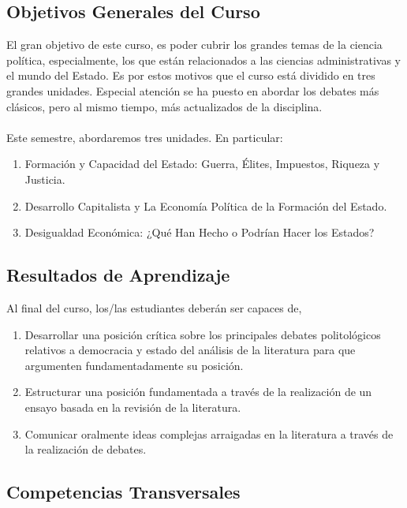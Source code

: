 \documentclass[letterpaper]{article}
\begin{document}
\subsection*{Objetivos Generales del Curso}

El gran objetivo de este curso, es poder cubrir los grandes temas de la ciencia pol\'itica, especialmente, los que est\'an relacionados a las ciencias administrativas y el mundo del Estado. Es por estos motivos que el curso est\'a dividido en tres grandes unidades. Especial atenci\'on se ha puesto en abordar los debates m\'as cl\'asicos, pero al mismo tiempo, m\'as actualizados de la disciplina.
\\
\\
Este semestre, abordaremos tres unidades. En particular:

\begin{enumerate}
	\item Formaci\'on y Capacidad del Estado: Guerra, \'Elites, Impuestos, Riqueza y Justicia.
	\item Desarrollo Capitalista y La Econom\'ia Pol\'itica de la Formaci\'on del Estado.
	\item Desigualdad Econ\'omica: ¿Qu\'e Han Hecho o Podr\'ian Hacer los Estados?
\end{enumerate}
 

\subsection*{Resultados de Aprendizaje}

Al final del curso, los/las estudiantes deber\'an ser capaces de,

\begin{enumerate}
	\item Desarrollar una posici\'on cr\'itica sobre los principales debates politol\'ogicos relativos a democracia y estado del an\'alisis de la literatura para que argumenten fundamentadamente su posici\'on.
	\item Estructurar una posici\'on fundamentada a trav\'es de la realizaci\'on de un ensayo basada en la revisi\'on de la literatura.
	\item Comunicar oralmente ideas complejas arraigadas en la literatura a trav\'es de la realizaci\'on de debates.
\end{enumerate}

\subsection*{Competencias Transversales}
\end{document}

